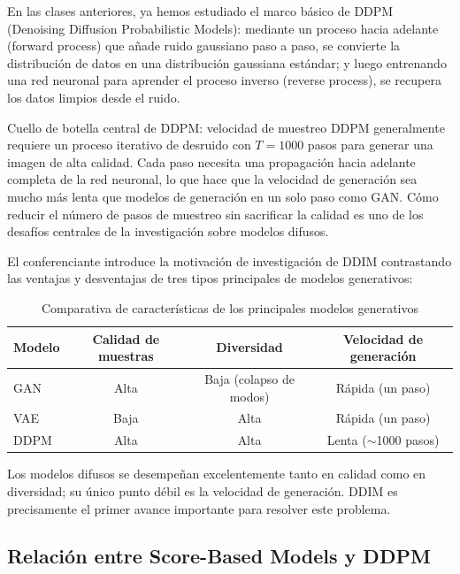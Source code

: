 \documentclass[a4paper]{article}
\begin{document}
En las clases anteriores, ya hemos estudiado el marco básico de DDPM (Denoising Diffusion Probabilistic Models): mediante un proceso hacia adelante (forward process) que añade ruido gaussiano paso a paso, se convierte la distribución de datos en una distribución gaussiana estándar; y luego entrenando una red neuronal para aprender el proceso inverso (reverse process), se recupera los datos limpios desde el ruido.

\begin{importantbox}{Cuello de botella central de DDPM: velocidad de muestreo}
DDPM generalmente requiere un proceso iterativo de desruido con $T=1000$ pasos para generar una imagen de alta calidad. Cada paso necesita una propagación hacia adelante completa de la red neuronal, lo que hace que la velocidad de generación sea mucho más lenta que modelos de generación en un solo paso como GAN. Cómo reducir el número de pasos de muestreo sin sacrificar la calidad es uno de los desafíos centrales de la investigación sobre modelos difusos.
\end{importantbox}

El conferenciante introduce la motivación de investigación de DDIM contrastando las ventajas y desventajas de tres tipos principales de modelos generativos:

\begin{table}[H]
\centering
\caption{Comparativa de características de los principales modelos generativos}
\begin{tabular}{lccc}
\toprule
\textbf{Modelo} & \textbf{Calidad de muestras} & \textbf{Diversidad} & \textbf{Velocidad de generación} \\
\midrule
GAN & Alta & Baja (colapso de modos) & Rápida (un paso) \\
VAE & Baja & Alta & Rápida (un paso) \\
DDPM & Alta & Alta & Lenta ($\sim$1000 pasos) \\
\bottomrule
\end{tabular}
\end{table}

Los modelos difusos se desempeñan excelentemente tanto en calidad como en diversidad; su único punto débil es la velocidad de generación. DDIM es precisamente el primer avance importante para resolver este problema.

\subsection{Relación entre Score-Based Models y DDPM}
\end{document}
